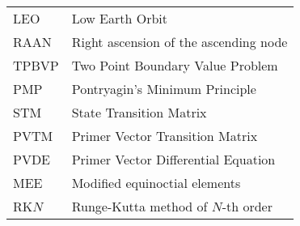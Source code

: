 \begin{longtable}{ll}
LEO & Low Earth Orbit \\
RAAN & Right ascension of the ascending node \\
TPBVP & Two Point Boundary Value Problem \\
PMP & Pontryagin's Minimum Principle \\
STM & State Transition Matrix \\
PVTM & Primer Vector Transition Matrix \\
PVDE & Primer Vector Differential Equation \\
MEE & Modified equinoctial elements \\
RK\(N\) & Runge-Kutta method of \(N\)-th order
\end{longtable}

